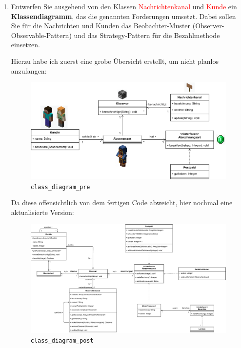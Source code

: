 \documentclass{article}
\begin{document}
    \begin{enumerate}[label=\alph*.]
        \item Entwerfen Sie ausgehend von den Klassen \textcolor{red}{Nachrichtenkanal} und \textcolor{red}{Kunde} ein \textbf{Klassendiagramm}, das die genannten Forderungen umsetzt.
            Dabei sollen Sie für die Nachrichten und Kunden das Beobachter-Muster (Observer-Observable-Pattern) und das Strategy-Pattern für die Bezahlmethode einsetzen.

            Hierzu habe ich zuerst eine grobe Übersicht erstellt, um nicht planlos anzufangen:

            \begin{figure}[ht]
                \includegraphics[width=\textwidth]{swt_wende_tim_h08_class_diagram_pre.pdf}
                \caption{\texttt{class\_diagram\_pre}}
            \end{figure}

            \newpage
            Da diese offensichtlich von dem fertigen Code abweicht, hier nochmal eine aktualisierte Version:
            \begin{figure}[ht]
                \includegraphics[width=\textwidth]{swt_wende_tim_h08_class_diagram_post.pdf}
                \caption{\texttt{class\_diagram\_post}}
            \end{figure}


\end{enumerate}
\end{document}
